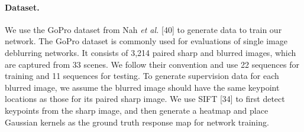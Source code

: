 \documentclass[10pt,twocolumn,letterpaper]{article}
\begin{document}
\paragraph{Dataset.}
We use the GoPro dataset from Nah \textit{et al.} [40] to generate data to train our network. The GoPro dataset is commonly used for evaluations of single image deblurring networks. It consists of 3,214 paired sharp and blurred images, which are captured from 33 scenes. We follow their convention and use 22 sequences for training and 11 sequences for testing. To generate supervision data for each blurred image, we assume the blurred image should have the same keypoint locations as those for its paired sharp image. We use SIFT [34] to first detect keypoints from the sharp image, and then generate a heatmap and place Gaussian kernels as the ground truth response map for network training.
\end{document}
